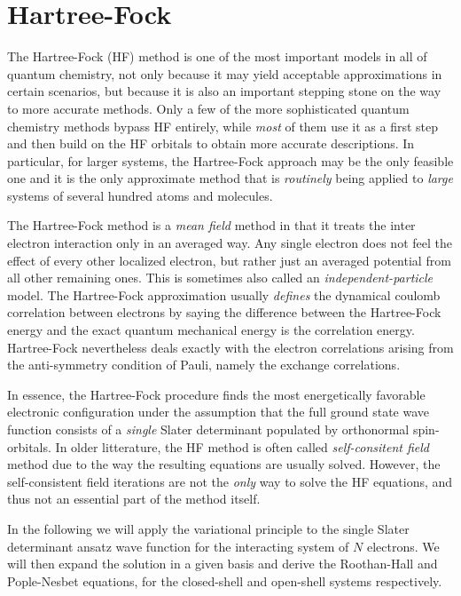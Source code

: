 \documentclass[../../master.tex]{subfiles}
\begin{document}
\renewcommand{\R}{{\bf R}}
\renewcommand{\r}{{\bf r}}
\newcommand{\x}{{\bf x}}
\newcommand{\psiz}{|\Psi_0\rangle}


\chapter{Hartree-Fock}
The Hartree-Fock (HF) method is one of the most important models in all of quantum chemistry, not only because it may yield acceptable approximations in certain scenarios, but because it is also an important stepping stone on the way to more accurate methods. Only a few of the more sophisticated quantum chemistry methods bypass HF entirely, while \emph{most} of them use it as a first step and then build on the HF orbitals to obtain more accurate descriptions\cite{szabo}. In particular, for larger systems, the Hartree-Fock approach may be the only feasible one and it is the only approximate method that is \emph{routinely} being applied to \emph{large} systems of several hundred atoms and molecules\cite{helgaker}.

The Hartree-Fock method is a \emph{mean field} method in that it treats the inter electron interaction only in an averaged way\cite{kvaal}. Any single electron does not feel the effect of every other localized electron, but rather just an averaged potential from all other remaining ones. This is sometimes also called an \emph{independent-particle} model. The Hartree-Fock approximation usually \emph{defines} the dynamical coulomb correlation between electrons by saying the difference between the Hartree-Fock energy and the exact quantum mechanical energy is the correlation energy. Hartree-Fock nevertheless deals exactly with the electron correlations arising from the anti-symmetry condition of Pauli, namely the exchange correlations. 

In essence, the Hartree-Fock procedure finds the most energetically favorable electronic configuration under the assumption that the full ground state wave function consists of a \emph{single} Slater determinant populated by orthonormal spin-orbitals. In older litterature, the HF method is often called \emph{self-consitent field} method due to the way the resulting equations are usually solved\cite{levine}. However, the self-consistent field iterations are not the \emph{only} way to solve the HF equations, and thus not an essential part of the method itself\cite{helgaker}.

In the following we will apply the variational principle to the single Slater determinant ansatz wave function for the interacting system of $N$ electrons. We will then expand the solution in a given basis and derive the Roothan-Hall and Pople-Nesbet equations, for the closed-shell and open-shell systems respectively. 
\end{document}
